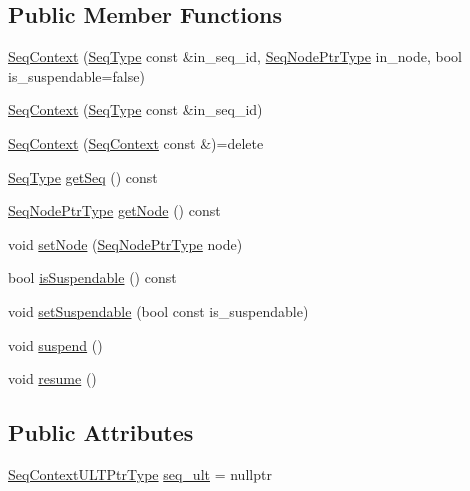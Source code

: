 \subsection*{Public Member Functions}
\begin{DoxyCompactItemize}
\item 
\hyperlink{structvt_1_1seq_1_1_seq_context_a3f994bf7ead90f03320b94bc2797039b}{Seq\+Context} (\hyperlink{namespacevt_1_1seq_a3b612da217ac669d39c159f134ab8434}{Seq\+Type} const \&in\+\_\+seq\+\_\+id, \hyperlink{namespacevt_1_1seq_ae6a4874b585be0612aaca32ca6d2d191}{Seq\+Node\+Ptr\+Type} in\+\_\+node, bool is\+\_\+suspendable=false)
\item 
\hyperlink{structvt_1_1seq_1_1_seq_context_a797189d52bbfd7eb2f776119068461bd}{Seq\+Context} (\hyperlink{namespacevt_1_1seq_a3b612da217ac669d39c159f134ab8434}{Seq\+Type} const \&in\+\_\+seq\+\_\+id)
\item 
\hyperlink{structvt_1_1seq_1_1_seq_context_a296fda6917a2f69772f8f1b9faceeadb}{Seq\+Context} (\hyperlink{structvt_1_1seq_1_1_seq_context}{Seq\+Context} const \&)=delete
\item 
\hyperlink{namespacevt_1_1seq_a3b612da217ac669d39c159f134ab8434}{Seq\+Type} \hyperlink{structvt_1_1seq_1_1_seq_context_a24fb30ec00c71ae6ae51ba6931957f2a}{get\+Seq} () const
\item 
\hyperlink{namespacevt_1_1seq_ae6a4874b585be0612aaca32ca6d2d191}{Seq\+Node\+Ptr\+Type} \hyperlink{structvt_1_1seq_1_1_seq_context_a9fd5265c51699de8e5a33e297333bd45}{get\+Node} () const
\item 
void \hyperlink{structvt_1_1seq_1_1_seq_context_a90e58dfc548cdcfa05665588f6ef4a5a}{set\+Node} (\hyperlink{namespacevt_1_1seq_ae6a4874b585be0612aaca32ca6d2d191}{Seq\+Node\+Ptr\+Type} node)
\item 
bool \hyperlink{structvt_1_1seq_1_1_seq_context_a5ad2faf1024f75aee49020194022a831}{is\+Suspendable} () const
\item 
void \hyperlink{structvt_1_1seq_1_1_seq_context_a92465215f2a9331e305dd0cf8306bf28}{set\+Suspendable} (bool const is\+\_\+suspendable)
\item 
void \hyperlink{structvt_1_1seq_1_1_seq_context_af53636e2ee35cc96e203e738f9e118b3}{suspend} ()
\item 
void \hyperlink{structvt_1_1seq_1_1_seq_context_ae46197afa12567c6a068c0cd4ec92be9}{resume} ()
\end{DoxyCompactItemize}
\subsection*{Public Attributes}
\begin{DoxyCompactItemize}
\item 
\hyperlink{structvt_1_1seq_1_1_seq_context_a7e5dc3958df8473c5bcd938f0f2cf933}{Seq\+Context\+U\+L\+T\+Ptr\+Type} \hyperlink{structvt_1_1seq_1_1_seq_context_a8b90e0946bbef6e744a1030699b047ef}{seq\+\_\+ult} = nullptr
\end{DoxyCompactItemize}
